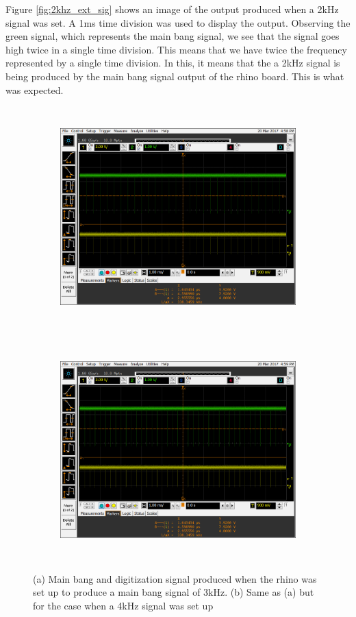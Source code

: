 \documentclass[12pt, a4paper]{article}
\begin{document}
Figure \ref{fig:2khz_ext_sig} shows an image of the output produced when a 2kHz signal was set. A 1ms time division was used to display the output. Observing the green signal, which represents the main bang signal, we see that the signal goes high twice in a single time division. This means that we have twice the frequency represented by a single time division. In this, it means that the a 2kHz signal is being produced by the main bang signal output of the rhino board. This is what was expected.

	\begin{figure}[t]
		\begin{subfigure}{13.5cm}
			\includegraphics[width=13cm,height=8.5cm]{3khz_ext_500ns}
			\caption{}
			\label{fig:3khz_ext_sig} 
		\end{subfigure}
		
		\begin{subfigure}{13.5cm}
			\includegraphics[width=13cm,height=8.5cm]{4khz_ext_500ns}
			\caption{}
			\label{fig:4khz_ext_sig}
		\end{subfigure}
		
		\caption{(a) Main bang and digitization signal produced when the rhino was set up to produce a main bang signal of 3kHz. (b) Same as (a) but for the case when a 4kHz signal was set up}
		\label{fig:3_4_khz_ext_sig}
	\end{figure}
\end{document}
